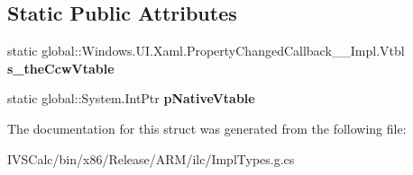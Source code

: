 \subsection*{Static Public Attributes}
\begin{DoxyCompactItemize}
\item 
\mbox{\label{struct_windows_1_1_u_i_1_1_xaml_1_1_property_changed_callback_____impl_1_1_vtbl_a38a03a5f24f81a6cc3b3c8299f84f0e0}} 
static global\+::\+Windows.\+U\+I.\+Xaml.\+Property\+Changed\+Callback\+\_\+\+\_\+\+Impl.\+Vtbl {\bfseries s\+\_\+the\+Ccw\+Vtable}
\item 
\mbox{\label{struct_windows_1_1_u_i_1_1_xaml_1_1_property_changed_callback_____impl_1_1_vtbl_aa3c179eeb47c8ca5b938512825c06ad7}} 
static global\+::\+System.\+Int\+Ptr {\bfseries p\+Native\+Vtable}
\end{DoxyCompactItemize}


The documentation for this struct was generated from the following file\+:\begin{DoxyCompactItemize}
\item 
I\+V\+S\+Calc/bin/x86/\+Release/\+A\+R\+M/ilc/Impl\+Types.\+g.\+cs\end{DoxyCompactItemize}
